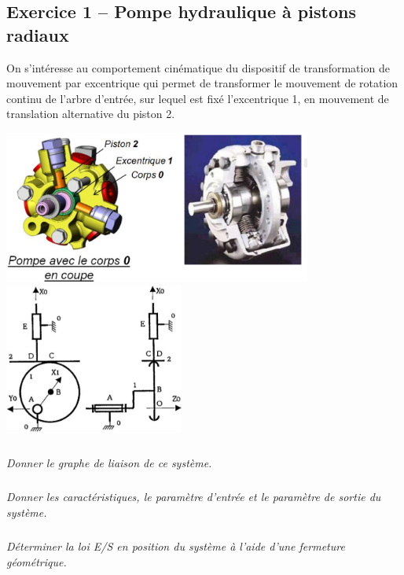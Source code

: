 \documentclass[11pt,oneside]{article}
\begin{document}
\subsection*{Exercice 1 -- Pompe hydraulique à pistons radiaux}
 
On s’intéresse au comportement cinématique du dispositif de transformation de mouvement par excentrique 
qui permet de transformer le mouvement de rotation continu de l’arbre d’entrée, sur lequel est fixé 
l’excentrique 1, en mouvement de translation alternative du piston 2. 

\begin{center}
\includegraphics[height=5cm]{png/fig1} 
\includegraphics[height=5cm]{png/fig2} 
\end{center}




\subparagraph{}
\textit{Donner le graphe de liaison de ce système.}


\subparagraph{}
\textit{Donner les caractéristiques, le paramètre d’entrée et le paramètre de sortie du système. }



\subparagraph{}
\textit{Déterminer la loi E/S en position du système à l’aide d’une fermeture géométrique. }
\end{document}
